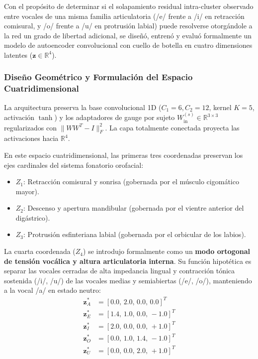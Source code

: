 \documentclass[11pt,a4paper,openany]{book}
\theoremstyle{definition}
\begin{document}
Con el propósito de determinar si el solapamiento residual intra-cluster observado entre vocales de una misma familia articulatoria (/e/ frente a /i/ en retracción comisural, y /o/ frente a /u/ en protrusión labial) puede resolverse otorgándole a la red un grado de libertad adicional, se diseñó, entrenó y evaluó formalmente un modelo de autoencoder convolucional con cuello de botella en cuatro dimensiones latentes ($\mathbf{z} \in \mathbb{R}^4$).

\subsubsection{Diseño Geométrico y Formulación del Espacio Cuatridimensional}

La arquitectura preserva la base convolucional 1D ($C_1 = 6, C_2 = 12$, kernel $K = 5$, activación $\tanh$) y los adaptadores de gauge por sujeto $W_{\text{in}}^{(s)} \in \mathbb{R}^{3 \times 3}$ regularizados con $\|W W^T - I\|_F^2$. La capa totalmente conectada proyecta las activaciones hacia $\mathbb{R}^4$. 

En este espacio cuatridimensional, las primeras tres coordenadas preservan los ejes cardinales del sistema fonatorio orofacial:
\begin{itemize}
    \item $Z_1$: Retracción comisural y sonrisa (gobernada por el músculo cigomático mayor).
    \item $Z_2$: Descenso y apertura mandibular (gobernada por el vientre anterior del digástrico).
    \item $Z_3$: Protrusión esfinteriana labial (gobernada por el orbicular de los labios).
\end{itemize}

La cuarta coordenada ($Z_4$) se introdujo formalmente como un \textbf{modo ortogonal de tensión vocálica y altura articulatoria interna}. Su función hipotética es separar las vocales cerradas de alta impedancia lingual y contracción tónica sostenida (/i/, /u/) de las vocales medias y semiabiertas (/e/, /o/), manteniendo a la vocal /a/ en estado neutro:
\begin{align}
    \mathbf{z}_A^* &= [0.0,\, 2.0,\, 0.0,\, 0.0]^T \\
    \mathbf{z}_E^* &= [1.4,\, 1.0,\, 0.0,\, -1.0]^T \\
    \mathbf{z}_I^* &= [2.0,\, 0.0,\, 0.0,\, +1.0]^T \\
    \mathbf{z}_O^* &= [0.0,\, 1.0,\, 1.4,\, -1.0]^T \\
    \mathbf{z}_U^* &= [0.0,\, 0.0,\, 2.0,\, +1.0]^T
\end{align}
\end{document}
